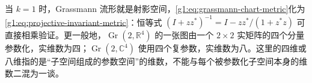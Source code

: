 当 \(k=1\) 时，Grassmann 流形就是射影空间，\eqref{g1:eq:grassmann-chart-metric}化为\eqref{g1:eq:projective-invariant-metric}：恒等式 \((I+zz^*)^{-1}=I-zz^*/(1+z^*z)\) 可直接相乘验证。更一般地，\(\operatorname{Gr}(2,\mathbb R^4)\) 的一张图由一个 \(2\times2\) 实矩阵的四个分量参数化，实维数为四；\(\operatorname{Gr}(2,\mathbb C^4)\) 使用四个复参数，实维数为八。这里的四维或八维指的是“子空间组成的参数空间”的维数，不能与每个被参数化子空间本身的维数二混为一谈。


